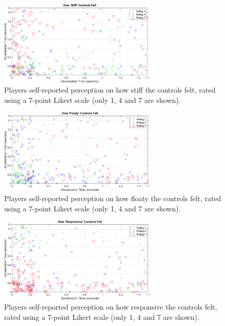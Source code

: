 \begin{figure}[htbp]
\centering
\includegraphics[width=0.67\textwidth]{Pics/Classes/Stiff_classes}
\caption{Players self-reported perception on how stiff the controls felt, rated using a 7-point Likert scale (only 1, 4 and 7 are shown).}
\label{fig:stiff}
\end{figure}

\begin{figure}[htbp]
\centering
\includegraphics[width=0.67\textwidth]{Pics/Classes/Floaty_classes}
\caption{Players self-reported perception on how floaty the controls felt, rated using a 7-point Likert scale (only 1, 4 and 7 are shown).}
\label{fig:floaty}
\end{figure}

\begin{figure}[htbp]
\centering
\includegraphics[width=0.67\textwidth]{Pics/Classes/Responsive_classes}
\caption{Players self-reported perception on how responsive the controls felt, rated using a 7-point Likert scale (only 1, 4 and 7 are shown).}
\label{fig:responsive}
\end{figure}

